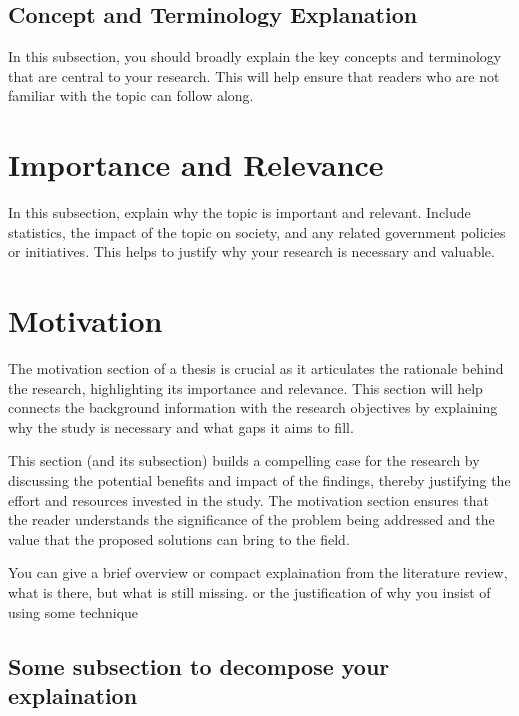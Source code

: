 \subsection{Concept and Terminology Explanation}

In this subsection, you should broadly explain the key concepts and terminology that are central to your research. This will help ensure that readers who are not familiar with the topic can follow along.




\section{ Importance and Relevance} 
\label{SplitScheduleExplain}

In this subsection, explain why the topic is important and relevant. Include statistics, the impact of the topic on society, and any related government policies or initiatives. This helps to justify why your research is necessary and valuable.




\section{Motivation}

The motivation section of a thesis is crucial as it articulates the rationale behind the research, highlighting its importance and relevance. This section will help connects the background information with the research objectives by explaining why the study is necessary and what gaps it aims to fill. 

This section (and its subsection) builds a compelling case for the research by discussing the potential benefits and impact of the findings, thereby justifying the effort and resources invested in the study. The motivation section ensures that the reader understands the significance of the problem being addressed and the value that the proposed solutions can bring to the field.

You can give a brief overview or compact explaination from the literature review, what is there, but what is still missing. or the justification of why you insist of using some technique


\subsection{Some subsection to decompose your explaination}




